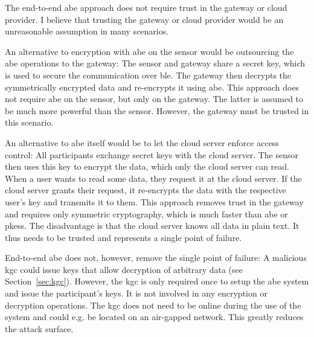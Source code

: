 The end-to-end \acrshort{abe} approach does not require trust in the gateway or cloud provider.
I believe that trusting the gateway or cloud provider would be an unreasonable assumption in many scenarios.

An alternative to encryption with \acrshort{abe} on the sensor would be outsourcing the \acrshort{abe} operations to the gateway:
The sensor and gateway share a secret key, which is used to secure the communication over \acrshort{ble}.
The gateway then decrypts the symmetrically encrypted data and re-encrypts it using \acrshort{abe}.
This approach does not require \acrshort{abe} on the sensor, but only on the gateway.
The latter is assumed to be much more powerful than the sensor.
However, the gateway must be trusted in this scenario.

An alternative to \acrshort{abe} itself would be to let the cloud server enforce access control:
All participants exchange secret keys with the cloud server.
The sensor then uses this key to encrypt the data, which only the cloud server can read.
When a user wants to read some data, they request it at the cloud server.
If the cloud server grants their request, it re-encrypts the data with the respective user's key and transmits it to them.
This approach removes trust in the gateway and requires only symmetric cryptography, which is much faster than \acrshort{abe} or \glspl{pkes}.
The disadvantage is that the cloud server knows all data in plain text. It thus needs to be trusted and represents a single point of failure.

End-to-end \acrshort{abe} does not, however, remove the single point of failure:
A malicious \acrfull{kgc} could issue keys that allow decryption of arbitrary data (see Section~\ref{sec:kgc}).
However, the \acrfull{kgc} is only required once to setup the \acrshort{abe} system and issue the participant's keys.
It is not involved in any encryption or decryption operations.
The \acrshort{kgc} does not need to be online during the use of the system and could e.g. be located on an air-gapped network. 
This greatly reduces the attack surface.
~\\




